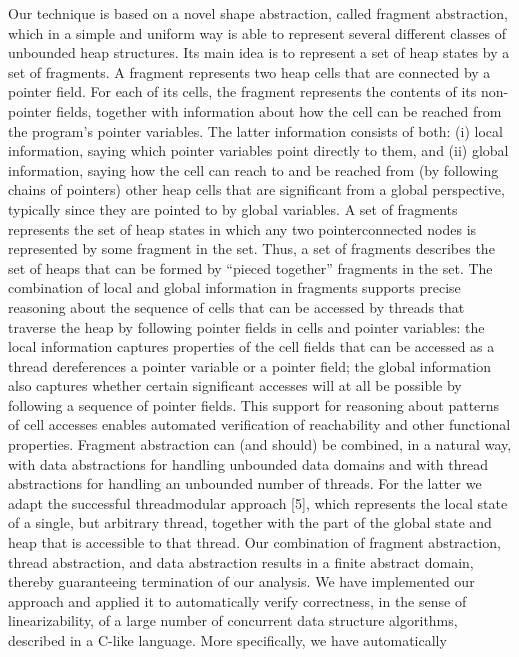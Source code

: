 Our technique is based on a novel shape abstraction, called fragment abstraction,
which in a simple and uniform way is able to represent several different classes of
unbounded heap structures. Its main idea is to represent a set of heap states by a set
of fragments. A fragment represents two heap cells that are connected by a pointer
field. For each of its cells, the fragment represents the contents of its non-pointer fields,
together with information about how the cell can be reached from the program’s pointer
variables. The latter information consists of both: (i) local information, saying which
pointer variables point directly to them, and (ii) global information, saying how the cell
can reach to and be reached from (by following chains of pointers) other heap cells that
are significant from a global perspective, typically since they are pointed to by global
variables. A set of fragments represents the set of heap states in which any two pointerconnected nodes is represented by some fragment in the set. Thus, a set of fragments
describes the set of heaps that can be formed by “pieced together” fragments in the
set. The combination of local and global information in fragments supports precise
reasoning about the sequence of cells that can be accessed by threads that traverse the
heap by following pointer fields in cells and pointer variables: the local information
captures properties of the cell fields that can be accessed as a thread dereferences a
pointer variable or a pointer field; the global information also captures whether certain
significant accesses will at all be possible by following a sequence of pointer fields. This
support for reasoning about patterns of cell accesses enables automated verification of
reachability and other functional properties.
Fragment abstraction can (and should) be combined, in a natural way, with data abstractions for handling unbounded data domains and with thread abstractions for handling an unbounded number of threads. For the latter we adapt the successful threadmodular approach [5], which represents the local state of a single, but arbitrary thread,
together with the part of the global state and heap that is accessible to that thread. Our
combination of fragment abstraction, thread abstraction, and data abstraction results in
a finite abstract domain, thereby guaranteeing termination of our analysis.
We have implemented our approach and applied it to automatically verify correctness, in the sense of linearizability, of a large number of concurrent data structure
algorithms, described in a C-like language. More specifically, we have automatically
